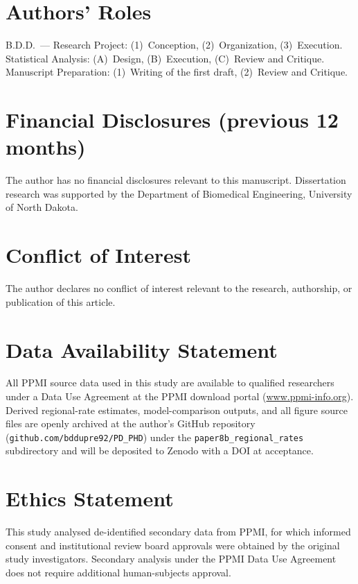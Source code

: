 
\section*{Authors' Roles}

B.D.D.\ --- Research Project: (1)~Conception, (2)~Organization, (3)~Execution. Statistical Analysis: (A)~Design, (B)~Execution, (C)~Review and Critique. Manuscript Preparation: (1)~Writing of the first draft, (2)~Review and Critique.

\section*{Financial Disclosures (previous 12 months)}

The author has no financial disclosures relevant to this manuscript. Dissertation research was supported by the Department of Biomedical Engineering, University of North Dakota.

\section*{Conflict of Interest}

The author declares no conflict of interest relevant to the research, authorship, or publication of this article.

\section*{Data Availability Statement}

All PPMI source data used in this study are available to qualified researchers under a Data Use Agreement at the PPMI download portal (\url{www.ppmi-info.org}). Derived regional-rate estimates, model-comparison outputs, and all figure source files are openly archived at the author's GitHub repository (\texttt{github.com/bddupre92/PD\_PHD}) under the \texttt{paper8b\_regional\_rates} subdirectory and will be deposited to Zenodo with a DOI at acceptance.

\section*{Ethics Statement}

This study analysed de-identified secondary data from PPMI, for which informed consent and institutional review board approvals were obtained by the original study investigators. Secondary analysis under the PPMI Data Use Agreement does not require additional human-subjects approval.

